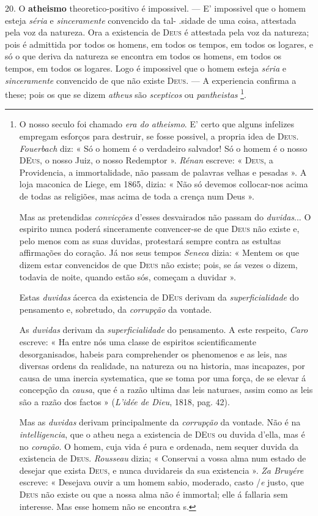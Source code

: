 20. O \textbf{atheismo} theoretico-positivo é impossivel. --- E' impossivel que o homem esteja \emph{séria} e \emph{sinceramente} convencido da tal- .sidade de uma coisa, attestada pela voz da natureza. Ora a existencia de \textsc{Deus} é attestada pela voz da natureza; pois é admittida por todos os homens, em todos os tempos, em todos os logares, e só o que deriva da natureza se encontra em todos os homens, em todos os tempos, em todos os logares. Logo é impossivel que o homem esteja \emph{séria} e \emph{sinceramente} convencido de que não existe \textsc{Deus}. --- A experiencia confirma a these; pois os que se dizem \emph{atheus} são \emph{scepticos} ou \emph{pantheistas} \footnote{O nosso seculo foi chamado \emph{era do atheismo}. E' certo que alguns infelizes empregam esforços para destruir, se fosse possivel, a propria idea de \textsc{Deus}. \emph{Fouerbach} diz: « Só o homem é o verdadeiro salvador! Só o homem é o nosso \textsc{DEus}, o nosso Juiz, o nosso Redemptor ». \emph{Rénan} escreve: « \textsc{Deus}, a Providencia, a immortalidade, não passam de palavras velhas e pesadas ». A loja maconica de Liege, em 1865, dizia: « Não só devemos collocar-nos acima de todas as religiões, mas acima de toda a crença num Deus ».\par Mas as pretendidas \emph{convicções} d'esses desvairados não passam do \emph{duvidas}... O espirito nunca poderá sinceramente convencer-se de que \textsc{Deus} não existe e, pelo menos com as suas duvidas, protestará sempre contra as estultas affirmações do coração. Já nos seus tempos \emph{Seneca} dizia: « Mentem os que dizem estar convencidos de que \textsc{Deus} não existe; pois, se ás vezes o dizem, todavia de noite, quando estão sós, começam a duvidar ».\par Estas \emph{duvidas} ácerca da existencia de \textsc{DEus} derivam da \emph{superficialidade} do pensamento e, sobretudo, da \emph{corrupção} da vontade.\par As \emph{duvidas} derivam da \emph{superficialidade} do pensamento. A este respeito, \emph{Caro} escreve: « Ha entre nós uma classe de espiritos scientificamente desorganisados, habeis para comprehender os phenomenos e as leis, nas diversas ordens da realidade, na natureza ou na historia, mas incapazes, por causa de uma inercia systematica, que se toma por uma força, de se elevar á concepção da \emph{causa}, que é a razão ultima das leis naturaes, assim como as leis são a razão dos factos » (\emph{L'idée de Dieu}, 1818, pag. 42).\par Mas as \emph{duvidas} derivam principalmente da \emph{corrupção} da vontade. Não é na \emph{intelligencia}, que o atheu nega a existencia de \textsc{DEus} ou duvida d'ella, mas é no \emph{coração}. O homem, cuja vida é pura e ordenada, nem sequer duvida da existencia de \textsc{Deus}. \emph{Rousseau} dizia; « Conservai a vossa alma num estado de desejar que exista \textsc{Deus}, e nunca duvidareis da sua existencia ». \emph{Za Bruyére} escreve: « Desejava ouvir a um homem sabio, moderado, casto /\emph{e} justo, que \textsc{Deus} não existe ou que a nossa alma não é immortal; elle á fallaria sem interesse. Mas esse homem não se encontra s.}.

